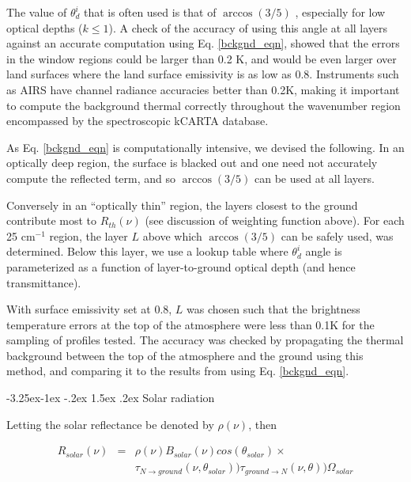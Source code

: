 \documentclass[11pt]{article}
\makeatletter
\newcommand{\kc}{\textsf{kCARTA}\xspace}
\newcommand{\wn}{cm$^{-1}$\xspace}
\renewcommand{\subsection}{\@startsection{subsection}{2}{\z@}%
                                     {-3.25ex\@plus -1ex \@minus -.2ex}%
                                     {1.5ex \@plus .2ex}%
                                     {\reset@font\normalsize\bfseries}}
\makeatother
\begin{document}
The value of $\theta^{i}_{d}$ that is often used is that of $\arccos(3/5)$
\cite{lio:80}, especially for low optical depths ($k \le 1$).  A check of the
accuracy of using this angle at all layers against an accurate computation
using Eq. \ref{bckgnd_eqn}, showed that the errors in the window regions could
be larger than 0.2 K, and would be even larger over land surfaces where the
land surface emissivity is as low as 0.8. Instruments such as AIRS have
channel radiance accuracies better than 0.2K, making it important to compute
the background thermal correctly throughout the wavenumber region encompassed
by the spectroscopic \kc database.

As Eq. \ref{bckgnd_eqn} is computationally intensive, we devised the following.
In an optically deep region, the surface is blacked out and one need not
accurately compute the reflected term, and so $\arccos(3/5)$ can be used
at all layers.

Conversely in an ``optically thin'' region, the layers closest to the ground
contribute most to $R_{th}(\nu)$ (see discussion of weighting function above).
For each 25 \wn region, the layer $L$ above which $\arccos(3/5)$ can be
safely used, was determined. Below this layer, we use a lookup table where
$\theta^{i}_{d}$ angle is parameterized as a function of layer-to-ground
optical depth (and hence transmittance).

With surface emissivity set at 0.8, $L$ was chosen such that the brightness
temperature errors at the top of the atmosphere were less than 0.1K for the
sampling of profiles tested. The accuracy was checked by propagating the
thermal background between the top of the atmosphere and the ground using this
method, and comparing it to the results from using Eq. \ref{bckgnd_eqn}.

\subsection{Solar radiation}

Letting the solar reflectance be denoted by $\rho(\nu)$, then

\begin{eqnarray*}
R_{solar}(\nu) & = & \rho(\nu) B_{solar}(\nu) cos(\theta_{solar}) \times \\
& &                 \tau_{N \rightarrow ground}(\nu,\theta_{solar}))
                 \tau_{ground \rightarrow N}(\nu,\theta))
                 \Omega_{solar}
\end{eqnarray*}
\end{document}
